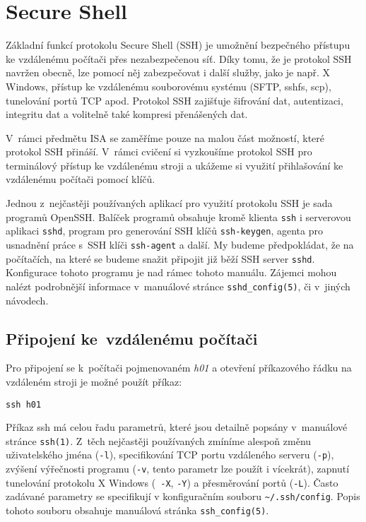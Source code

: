 \section{Secure Shell}
\label{ssh}

Základní funkcí protokolu Secure Shell (SSH) \cite{rfc4253} je umožnění bezpečného přístupu ke vzdálenému počítači přes nezabezpečenou síť. Díky tomu, že je protokol SSH navržen
obecně, lze pomocí něj zabezpečovat i další služby, jako je např. X Windows, přístup ke vzdálenému souborovému systému (SFTP, sshfs, scp), tunelování portů TCP apod. Protokol SSH
zajišťuje šifrování dat, autentizaci, integritu dat a volitelně také kompresi přenášených dat.

V~rámci předmětu ISA se zaměříme pouze na malou část možností, které protokol SSH přináší. V~rámci cvičení si vyzkoušíme protokol SSH pro terminálový přístup ke vzdálenému stroji a
ukážeme si využití přihlašování ke vzdálenému počítači pomocí klíčů.

Jednou z~nejčastěji používaných aplikací pro využití protokolu SSH je sada programů OpenSSH. Balíček programů obsahuje kromě klienta {\tt ssh} i serverovou aplikaci {\tt sshd}, program
pro generování SSH klíčů {\tt ssh-keygen}, agenta pro usnadnění práce s~SSH klíči {\tt ssh-agent} a další. My budeme předpokládat, že na počítačích, na které se budeme snažit připojit
již běží SSH server {\tt sshd}. Konfigurace tohoto programu je nad rámec tohoto manuálu. Zájemci mohou nalézt podrobnější informace v~manuálové stránce {\tt sshd\_config(5)}, či
v~jiných návodech.

\subsection{Připojení ke~vzdálenému počítači}

Pro připojení se k~počítači pojmenovaném \emph{h01} a otevření příkazového řádku na vzdáleném stroji je možné použít příkaz:

\begin{verbatim}
ssh h01
\end{verbatim}

Příkaz ssh má celou řadu parametrů, které jsou detailně popsány v~manuálové stránce {\tt ssh(1)}. Z~těch nejčastěji používaných zmíníme alespoň změnu uživatelského jména ({\tt -l}),
specifikování TCP portu vzdáleného serveru ({\tt -p}), zvýšení výřečnosti programu ({\tt -v}, tento parametr lze použít i vícekrát), zapnutí tunelování protokolu X Windows ({\tt
-X}, {\tt -Y}) a přesměrování portů ({\tt -L}). Často zadávané parametry se specifikují v konfiguračním souboru \verb|~/.ssh/config|. Popis tohoto souboru obsahuje manuálová
stránka {\tt ssh\_config(5)}.

